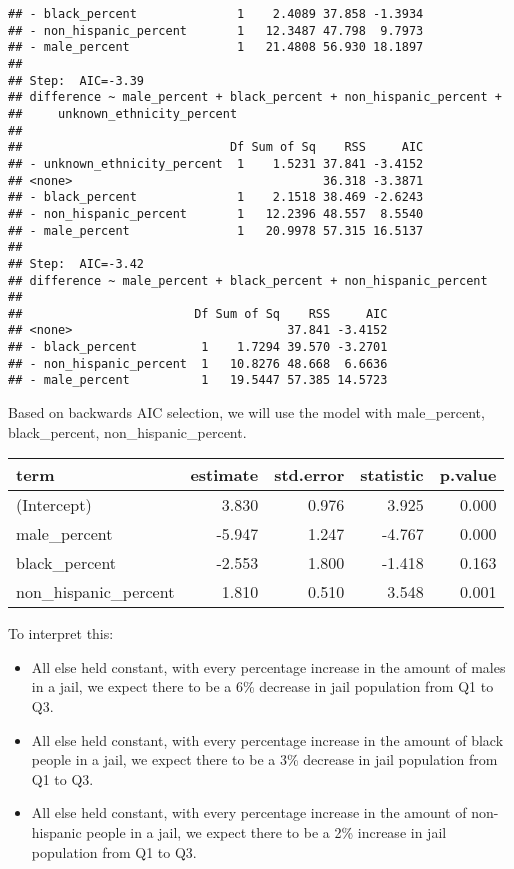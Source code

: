\documentclass[
]{article}
\newenvironment{Shaded}{\begin{snugshade}}{\end{snugshade}}
\newcommand{\DataTypeTok}[1]{\textcolor[rgb]{0.13,0.29,0.53}{#1}}
\newcommand{\DecValTok}[1]{\textcolor[rgb]{0.00,0.00,0.81}{#1}}
\newcommand{\KeywordTok}[1]{\textcolor[rgb]{0.13,0.29,0.53}{\textbf{#1}}}
\newcommand{\NormalTok}[1]{#1}
\newcommand{\OperatorTok}[1]{\textcolor[rgb]{0.81,0.36,0.00}{\textbf{#1}}}
\newcommand{\StringTok}[1]{\textcolor[rgb]{0.31,0.60,0.02}{#1}}
\begin{document}
\begin{verbatim}
## - black_percent              1    2.4089 37.858 -1.3934
## - non_hispanic_percent       1   12.3487 47.798  9.7973
## - male_percent               1   21.4808 56.930 18.1897
## 
## Step:  AIC=-3.39
## difference ~ male_percent + black_percent + non_hispanic_percent + 
##     unknown_ethnicity_percent
## 
##                             Df Sum of Sq    RSS     AIC
## - unknown_ethnicity_percent  1    1.5231 37.841 -3.4152
## <none>                                   36.318 -3.3871
## - black_percent              1    2.1518 38.469 -2.6243
## - non_hispanic_percent       1   12.2396 48.557  8.5540
## - male_percent               1   20.9978 57.315 16.5137
## 
## Step:  AIC=-3.42
## difference ~ male_percent + black_percent + non_hispanic_percent
## 
##                        Df Sum of Sq    RSS     AIC
## <none>                              37.841 -3.4152
## - black_percent         1    1.7294 39.570 -3.2701
## - non_hispanic_percent  1   10.8276 48.668  6.6636
## - male_percent          1   19.5447 57.385 14.5723
\end{verbatim}

Based on backwards AIC selection, we will use the model with
male\_percent, black\_percent, non\_hispanic\_percent.

\begin{Shaded}
\end{Shaded}

\begin{longtable}[]{@{}lrrrr@{}}
\toprule
term & estimate & std.error & statistic & p.value\tabularnewline
\midrule
\endhead
(Intercept) & 3.830 & 0.976 & 3.925 & 0.000\tabularnewline
male\_percent & -5.947 & 1.247 & -4.767 & 0.000\tabularnewline
black\_percent & -2.553 & 1.800 & -1.418 & 0.163\tabularnewline
non\_hispanic\_percent & 1.810 & 0.510 & 3.548 & 0.001\tabularnewline
\bottomrule
\end{longtable}

To interpret this:

\begin{itemize}
\item
  All else held constant, with every percentage increase in the amount
  of males in a jail, we expect there to be a 6\% decrease in jail
  population from Q1 to Q3.
\item
  All else held constant, with every percentage increase in the amount
  of black people in a jail, we expect there to be a 3\% decrease in
  jail population from Q1 to Q3.
\item
  All else held constant, with every percentage increase in the amount
  of non-hispanic people in a jail, we expect there to be a 2\% increase
  in jail population from Q1 to Q3.
\end{itemize}
\end{document}
